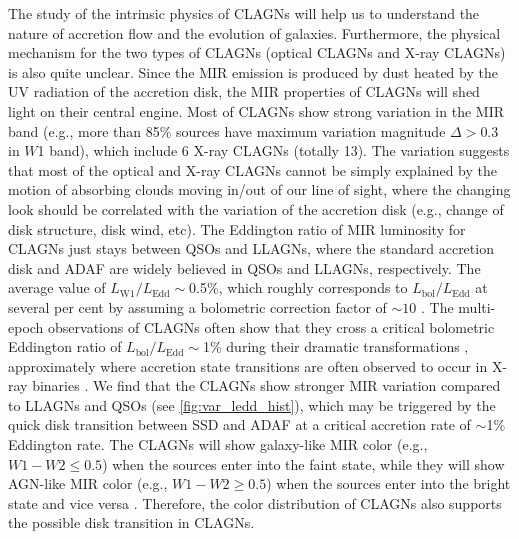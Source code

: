 \documentclass[linenumbers]{aastex631}
\begin{document}
The study of the intrinsic physics of CLAGNs will help us to understand the nature of accretion flow and the evolution of galaxies. Furthermore, the physical mechanism for the two types of CLAGNs (optical CLAGNs and X-ray CLAGNs) is also quite unclear. Since the MIR emission is produced by dust heated by the UV radiation of the accretion disk, the MIR properties of CLAGNs will shed light on their central engine. Most of CLAGNs show strong variation in the MIR band (e.g., more than 85\% sources have maximum variation magnitude $\Delta>0.3$ in $W$1 band), which include 6 X-ray CLAGNs (totally 13). The variation suggests that most of the optical and X-ray CLAGNs cannot be simply explained by the motion of absorbing clouds moving in/out of our line of sight, where the changing look should be correlated with the variation of the accretion disk (e.g., change of disk structure, disk wind, etc). The Eddington ratio of MIR luminosity for CLAGNs just stays between QSOs and LLAGNs, where the standard accretion disk and ADAF are widely believed in QSOs and LLAGNs, respectively. The average value of $L_\mathrm{W1}/L_\mathrm{Edd} \sim $0.5\%, which roughly corresponds to $L_\mathrm{bol}/L_\mathrm{Edd}$ at several per cent by assuming a bolometric correction factor of $\sim 10$ \citep[e.g.,][]{2012MNRAS.426.2677R}. The multi-epoch observations of CLAGNs often show that they cross a critical bolometric Eddington ratio of  $L_\mathrm{bol}/L_\mathrm{Edd}\sim$1\% during their dramatic transformations \citep[e.g.,][]{2019ApJ...883...76R,2021MNRAS.508..144G,2021MNRAS.506.4188L,2021MNRAS.507..687J}, approximately where accretion state transitions are often observed to occur in X-ray binaries \citep[e.g.,][]{2008ApJ...682..212W}. We find that the CLAGNs show stronger MIR variation compared to LLAGNs and QSOs (see \autoref{fig:var_ledd_hist}), which may be triggered by the quick disk transition between SSD and ADAF at a critical accretion rate of $\sim$1\% Eddington rate. The CLAGNs will show galaxy-like MIR color (e.g., $W1-W2\leq0.5$) when the sources enter into the faint state, while they will show AGN-like MIR color (e.g., $W1-W2\geq0.5$) when the sources enter into the bright state and vice versa \citep[e.g.,][]{2012ApJ...753...30S,2013AJ....145...55Y,2017ApJ...846L...7S}. Therefore, the color distribution of CLAGNs also supports the possible disk transition in CLAGNs. 

\end{document}
